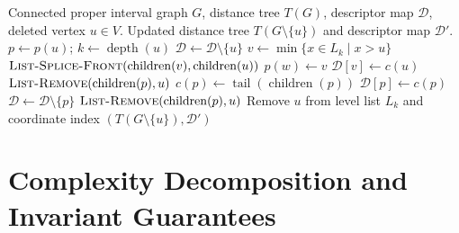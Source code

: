 \begin{algorithm}[htbp]
\caption{\textsc{Dynamic-Vertex-Delete}$(G, T, \mathcal{D}, u)$}
\label{alg:decremental_maintenance}
\begin{algorithmic}[1]
\Require Connected proper interval graph $G$, distance tree $T(G)$, descriptor map $\mathcal{D}$, deleted vertex $u \in V$.
\Ensure Updated distance tree $T(G \setminus \{u\})$ and descriptor map $\mathcal{D}'$.
\State $p \leftarrow p(u)$; \quad $k \leftarrow \operatorname{depth}(u)$
 
    \State $\mathcal{D} \leftarrow \mathcal{D} \setminus \{u\}$ 
    \State $v \leftarrow \min \{ x \in L_k \mid x > u \}$ 
    \State $\textsc{List-Splice-Front}(\operatorname{children}(v), \operatorname{children}(u))$ 
     
        \State $p(w) \leftarrow v$
    \EndFor
     
        \State $\mathcal{D}[v] \leftarrow c(u)$ 
    \EndIf
\EndIf
{} 
    \State $\textsc{List-Remove}(\operatorname{children}(p), u)$ 
        \State $c(p) \leftarrow \operatorname{tail}(\operatorname{children}(p))$ 
        \State $\mathcal{D}[p] \leftarrow c(p)$ 
    \Else
        \State $\mathcal{D} \leftarrow \mathcal{D} \setminus \{p\}$ 
    \EndIf
\Else
    \State $\textsc{List-Remove}(\operatorname{children}(p), u)$ 
\EndIf
\State Remove $u$ from level list $L_k$ and coordinate index
\State \Return $(T(G \setminus \{u\}), \mathcal{D}')$
\end{algorithmic}
\end{algorithm}

\section{Complexity Decomposition and Invariant Guarantees}
\label{sec:dynamic_complexity}

